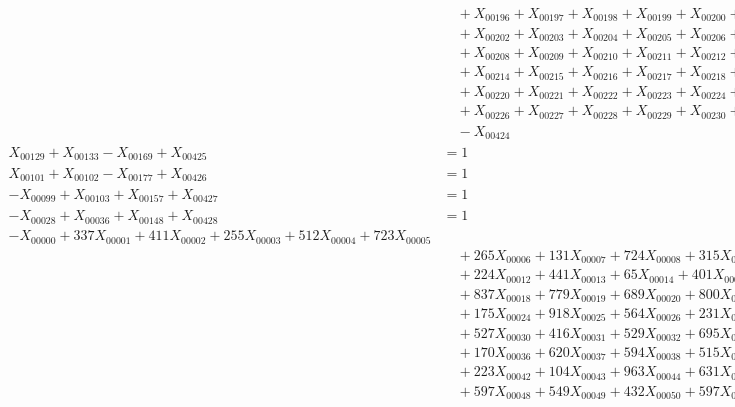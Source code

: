 \documentclass[a4paper,10pt]{article}
\begin{document}
{\begin{align}
&\quad  + X_{00196} + X_{00197} + X_{00198} + X_{00199} + X_{00200} + X_{00201} \\[0.5ex]
&\quad  + X_{00202} + X_{00203} + X_{00204} + X_{00205} + X_{00206} + X_{00207} \\[0.5ex]
&\quad  + X_{00208} + X_{00209} + X_{00210} + X_{00211} + X_{00212} + X_{00213} \\[0.5ex]
&\quad  + X_{00214} + X_{00215} + X_{00216} + X_{00217} + X_{00218} + X_{00219} \\[0.5ex]
&\quad  + X_{00220} + X_{00221} + X_{00222} + X_{00223} + X_{00224} + X_{00225} \\[0.5ex]
&\quad  + X_{00226} + X_{00227} + X_{00228} + X_{00229} + X_{00230} + X_{00231} \\[0.5ex]
&\quad  - X_{00424} &= 63 && \text{(R00193)} \\
X_{00129} + X_{00133} - X_{00169} + X_{00425} &= 1 && \text{(R00194)} \\
X_{00101} + X_{00102} - X_{00177} + X_{00426} &= 1 && \text{(R00195)} \\
-X_{00099} + X_{00103} + X_{00157} + X_{00427} &= 1 && \text{(R00196)} \\
-X_{00028} + X_{00036} + X_{00148} + X_{00428} &= 1 && \text{(R00197)} \\
-X_{00000} + 337X_{00001} + 411X_{00002} + 255X_{00003} + 512X_{00004} + 723X_{00005} \\[0.5ex]
&\quad  + 265X_{00006} + 131X_{00007} + 724X_{00008} + 315X_{00009} + 504X_{00010} + 455X_{00011} \\[0.5ex]
&\quad  + 224X_{00012} + 441X_{00013} + 65X_{00014} + 401X_{00015} + 432X_{00016} + 617X_{00017} \\[0.5ex]
&\quad  + 837X_{00018} + 779X_{00019} + 689X_{00020} + 800X_{00021} + 74X_{00022} + 160X_{00023} \\[0.5ex]
&\quad  + 175X_{00024} + 918X_{00025} + 564X_{00026} + 231X_{00027} + 449X_{00028} + 539X_{00029} \\[0.5ex]
&\quad  + 527X_{00030} + 416X_{00031} + 529X_{00032} + 695X_{00033} + 391X_{00034} + 575X_{00035} \\[0.5ex]
&\quad  + 170X_{00036} + 620X_{00037} + 594X_{00038} + 515X_{00039} + 478X_{00040} + 868X_{00041} \\[0.5ex]
&\quad  + 223X_{00042} + 104X_{00043} + 963X_{00044} + 631X_{00045} + 300X_{00046} + 392X_{00047} \\[0.5ex]
&\quad  + 597X_{00048} + 549X_{00049} + 432X_{00050} + 597X_{00051} + 754X_{00052} + 465X_{00053} \\[0.5ex]

\end{align}}
\end{document}
